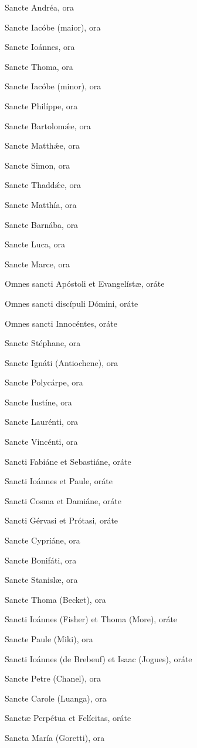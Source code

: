 \documentclass[12pt,a6paper]{book}
\begin{document}
\begin{sloppy}
Sancte Andréa, ora

Sancte Iacóbe (maior), ora

Sancte Ioánnes, ora

Sancte Thoma, ora

Sancte Iacóbe (minor), ora

Sancte Philíppe, ora

Sancte Bartolomǽe, ora

Sancte Matthǽe, ora

Sancte Simon, ora

Sancte Thaddǽe, ora

Sancte Matthía, ora

Sancte Barnába, ora

Sancte Luca, ora

Sancte Marce, ora

Omnes sancti Apóstoli et Evangelístæ, oráte

Omnes sancti discípuli Dómini, oráte

Omnes sancti Innocéntes, oráte

\vspace{3mm}

Sancte Stéphane, ora

Sancte Ignáti (Antiochene), ora

Sancte Polycárpe, ora

Sancte Iustíne, ora

Sancte Laurénti, ora

Sancte Vincénti, ora

Sancti Fabiáne et Sebastiáne, oráte

Sancti Ioánnes et Paule, oráte

Sancti Cosma et Damiáne, oráte

Sancti Gérvasi et Prótasi, oráte

Sancte Cypriáne, ora

Sancte Bonifáti, ora

Sancte Stanislæ, ora

Sancte Thoma (Becket), ora

Sancti Ioánnes (Fisher) et Thoma (More), oráte

Sancte Paule (Miki), ora

Sancti Ioánnes (de Brebeuf) et Isaac (Jogues), oráte

Sancte Petre (Chanel), ora

Sancte Carole (Luanga), ora

Sanctæ Perpétua et Felícitas, oráte

Sancta María (Goretti), ora


\end{sloppy}
\end{document}
